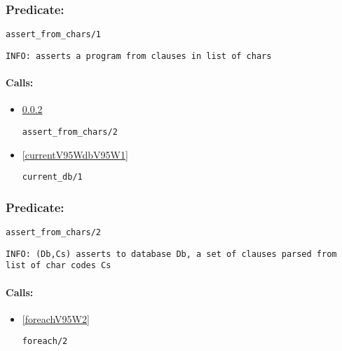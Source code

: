 \subsubsection{Predicate:} \label{assertV95WfromV95WcharsV95W1}

\begin{verbatim}
assert_from_chars/1
\end{verbatim}

{\small \begin{verbatim}
INFO: asserts a program from clauses in list of chars

\end{verbatim}}
\paragraph{Calls:} 
\begin{itemize}
\item \ref{assertV95WfromV95WcharsV95W2} 
\begin{verbatim}
assert_from_chars/2
\end{verbatim}

\item \ref{currentV95WdbV95W1} 
\begin{verbatim}
current_db/1
\end{verbatim}

\end{itemize}

\subsubsection{Predicate:} \label{assertV95WfromV95WcharsV95W2}

\begin{verbatim}
assert_from_chars/2
\end{verbatim}

{\small \begin{verbatim}
INFO: (Db,Cs) asserts to database Db, a set of clauses parsed from list of char codes Cs

\end{verbatim}}
\paragraph{Calls:} 
\begin{itemize}
\item \ref{foreachV95W2} 
\begin{verbatim}
foreach/2
\end{verbatim}

\end{itemize}
